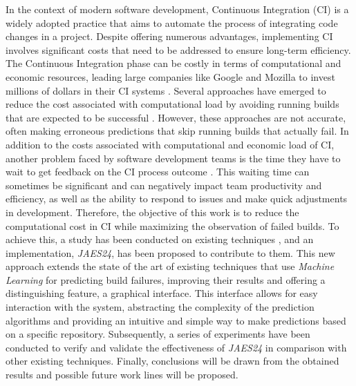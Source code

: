 \vspace{0.5cm}

\vspace{1cm}

In the context of modern software development, Continuous Integration (CI) is a widely adopted
practice that aims to automate the process of integrating code changes in a project. Despite
offering numerous advantages, implementing CI involves significant costs that need to be addressed
to ensure long-term efficiency. The Continuous Integration phase can be costly in terms of
computational and economic resources, leading large companies like Google and Mozilla to invest
millions of dollars in their CI systems \cite{1}. Several approaches have emerged to reduce the
cost associated with computational load by avoiding running builds that are expected to be
successful \cite{2}. However, these approaches are not accurate, often making erroneous
predictions that skip running builds that actually fail. In addition to the costs associated with
computational and economic load of CI, another problem faced by software development teams is the
time they have to wait to get feedback on the CI process outcome \cite{3}. This waiting time can
sometimes be significant and can negatively impact team productivity and efficiency, as well as
the ability to respond to issues and make quick adjustments in development. Therefore, the
objective of this work is to reduce the computational cost in CI while maximizing the observation
of failed builds. To achieve this, a study has been conducted on existing techniques
\cite{2,4,5,6,7,8}, and an implementation, \textit{JAES24}, has been proposed to contribute to them.
This new approach extends the state of the art of existing techniques that use
\textit{Machine Learning} for predicting build failures, improving their results and offering a
distinguishing feature, a graphical interface. This interface allows for easy interaction with the
system, abstracting the complexity of the prediction algorithms and providing an intuitive and simple
way to make predictions based on a specific repository. Subsequently, a series of experiments have
been conducted to verify and validate the effectiveness of \textit{JAES24} in comparison with other
existing techniques. Finally, conclusions will be drawn from the obtained results and possible
future work lines will be proposed.

\vspace{0.5cm}

\vfill
